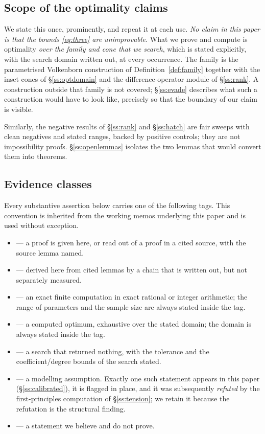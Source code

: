 \subsection{Scope of the optimality claims}\label{ss:scope}

We state this once, prominently, and repeat it at each use. \emph{No claim in this paper is
that the bounds \eqref{eq:three} are unimprovable.} What we prove and compute is optimality
\emph{over the family and cone that we search}, which is stated explicitly, with the search
domain written out, at every occurrence. The family is the parametrised Volkenborn
construction of Definition~\ref{def:family} together with the inset cones of
\S\ref{ss:optdomain} and the difference-operator module of \S\ref{ss:rank}. A construction
outside that family is not covered; \S\ref{ss:evade} describes what such a construction
would have to look like, precisely so that the boundary of our claim is visible.

Similarly, the negative results of \S\ref{ss:rank} and \S\ref{ss:hatch} are fair sweeps with
clean negatives and stated ranges, backed by positive controls; they are not impossibility
proofs. \S\ref{ss:openlemmas} isolates the two lemmas that would convert them into theorems.

\subsection{Evidence classes}\label{ss:evidence}

Every substantive assertion below carries one of the following tags. This convention is
inherited from the working memos underlying this paper and is used without exception.

\begin{itemize}[leftmargin=2.2em,itemsep=2pt]
\item \PROVED{} --- a proof is given here, or read out of a proof in a cited source, with the
      source lemma named.
\item \DERIVED{} --- derived here from cited lemmas by a chain that is written out, but not
      separately measured.
\item {} --- an exact finite computation in exact rational or integer arithmetic; the
      range of parameters and the sample size are always stated inside the tag.
\item {} --- a computed optimum, exhaustive over the stated domain; the domain is
      always stated inside the tag.
\item {} --- a search that returned nothing, with the tolerance and the
      coefficient/degree bounds of the search stated.
\item \CALIB{} --- a modelling assumption. Exactly one such statement appears in this paper
      (\S\ref{ss:calibrated}), it is flagged in place, and it was subsequently
      \emph{refuted} by the first-principles computation of \S\ref{ss:tension}; we retain it
      because the refutation is the structural finding.
\item \OPENC{} --- a statement we believe and do not prove.
\end{itemize}

